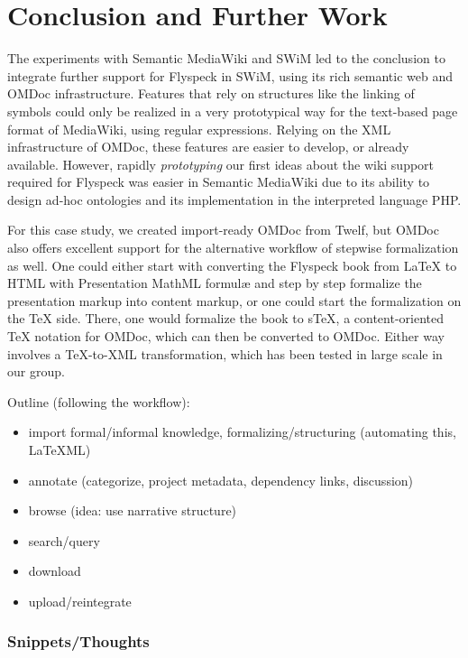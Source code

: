 
\section{Conclusion and Further Work}
\label{sec:conc}

The experiments with Semantic MediaWiki and SWiM led to the conclusion to
integrate further support for Flyspeck in SWiM, using its rich semantic web and
OMDoc infrastructure.  Features that rely on structures like the linking
of symbols could only be realized in a very prototypical way for the text-based
page format of MediaWiki, using regular expressions.  Relying on the XML
infrastructure of OMDoc, these features are easier to develop, or already
available.  However, rapidly \emph{prototyping} our first ideas about the wiki
support required for Flyspeck was easier in Semantic MediaWiki due to its
ability to design ad-hoc ontologies and its implementation in the interpreted
language PHP.

For this case study, we created import-ready OMDoc from Twelf, but OMDoc also
offers excellent support for the alternative workflow of stepwise formalization
as well\cite[chap.\ 4]{Kohlhase:omdoc1.2}.  One could either start with
converting the Flyspeck book from {\LaTeX} to HTML with Presentation MathML
formulæ and step by step formalize the presentation markup into content markup,
or one could start the formalization on the {\TeX} side.  There, one would
formalize the book to s\TeX{}, a content-oriented {\TeX} notation for OMDoc,
which can then be converted to OMDoc\cite{Kohlhase:albwo06}.  Either way
involves a {\TeX}-to-XML transformation, which has been tested in large scale in
our group\cite{URL:arXMLiv}.

Outline (following the workflow):
\begin{itemize}
\item import formal/informal knowledge, formalizing/structuring (automating
  this, LaTeXML)
\item annotate (categorize, project metadata, dependency links, discussion)
\item browse (idea: use narrative structure)
\item search/query
\item download
\item upload/reintegrate
\end{itemize}

\subsubsection{Snippets/Thoughts}

